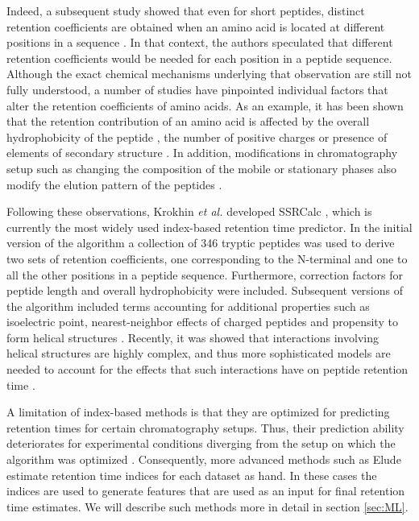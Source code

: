 \documentclass[a4paper]{article}
\begin{document}



Indeed, a subsequent study showed that even for short peptides,
distinct retention coefficients are obtained when an amino acid is
located at different positions in a sequence \cite{Houghten1987}. In
that context, the authors speculated that different retention
coefficients would be needed for each position in a peptide
sequence. Although the exact chemical mechanisms underlying that
observation are still not fully understood, a number of studies have
pinpointed individual factors that alter the retention coefficients of
amino acids. As an example, it has been shown that the retention
contribution of an amino acid is affected by the overall
hydrophobicity of the peptide \cite{Mant2006}, the number of positive
charges \cite{Mant2006} or presence of elements of secondary
structure \cite{Zhou1990}. In addition, modifications in
chromatography setup such as changing the composition of the mobile or
stationary phases also modify the elution pattern of the
peptides \cite{Browne1982, Guo1987, Gilar2010}.


Following these observations, Krokhin {\em et al.} developed {\sc
SSRCalc} \cite{Krokhin2004}, which is currently the most widely used
index-based retention time predictor. In the initial version of the
algorithm a collection of 346 tryptic peptides was used to derive two
sets of retention coefficients, one corresponding to the N-terminal
and one to all the other positions in a peptide sequence. Furthermore,
correction factors for peptide length and overall hydrophobicity were
included. Subsequent versions of the algorithm included terms
accounting for additional properties such as isoelectric point,
nearest-neighbor effects of charged peptides and propensity to form
helical structures \cite{Krokhin2006}. Recently, it was showed that
interactions involving helical structures are highly complex, and thus
more sophisticated models are needed to account for the effects that
such interactions have on peptide retention time \cite{ah}.

A limitation of index-based methods is that they are optimized for
predicting retention times for certain chromatography setups. Thus,
their prediction ability deteriorates for experimental conditions
diverging from the setup on which the algorithm was optimized
\cite{Spicer2007}. Consequently, more advanced methods such as {\sc
  Elude} \cite{elude1,elude2} estimate retention time indices for each
dataset as hand. In these cases the indices are used to generate
features that are used as an input for final retention time
estimates. We will describe such methods more in detail in section
\ref{sec:ML}.
\end{document}
